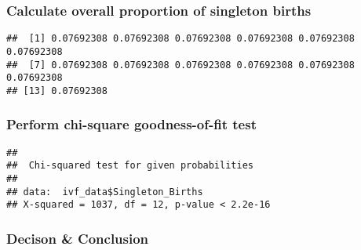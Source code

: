 \documentclass[
]{article}
\newenvironment{Shaded}{\begin{snugshade}}{\end{snugshade}}
\newcommand{\AttributeTok}[1]{\textcolor[rgb]{0.77,0.63,0.00}{#1}}
\newcommand{\DecValTok}[1]{\textcolor[rgb]{0.00,0.00,0.81}{#1}}
\newcommand{\FunctionTok}[1]{\textcolor[rgb]{0.00,0.00,0.00}{#1}}
\newcommand{\NormalTok}[1]{#1}
\newcommand{\OtherTok}[1]{\textcolor[rgb]{0.56,0.35,0.01}{#1}}
\newcommand{\SpecialCharTok}[1]{\textcolor[rgb]{0.00,0.00,0.00}{#1}}
\begin{document}
\hypertarget{calculate-overall-proportion-of-singleton-births}{%
\subsubsection{Calculate overall proportion of singleton
births}\label{calculate-overall-proportion-of-singleton-births}}

\begin{Shaded}
\end{Shaded}

\begin{verbatim}
##  [1] 0.07692308 0.07692308 0.07692308 0.07692308 0.07692308 0.07692308
##  [7] 0.07692308 0.07692308 0.07692308 0.07692308 0.07692308 0.07692308
## [13] 0.07692308
\end{verbatim}

\hypertarget{perform-chi-square-goodness-of-fit-test}{%
\subsubsection{Perform chi-square goodness-of-fit
test}\label{perform-chi-square-goodness-of-fit-test}}

\begin{Shaded}
\end{Shaded}

\begin{verbatim}
## 
##  Chi-squared test for given probabilities
## 
## data:  ivf_data$Singleton_Births
## X-squared = 1037, df = 12, p-value < 2.2e-16
\end{verbatim}

\hypertarget{decison-conclusion}{%
\subsubsection{Decison \& Conclusion}\label{decison-conclusion}}
\end{document}
